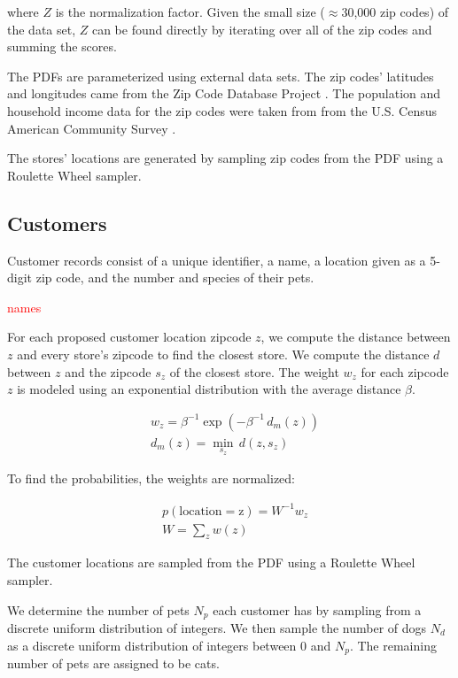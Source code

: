 \documentclass[conference]{IEEEtran}
\begin{document}
where $Z$ is the normalization factor.  Given the small size ($\approx$30,000 zip codes) of the data set, $Z$ can be found directly by iterating over all of the zip codes and summing the scores.

The PDFs are parameterized using external data sets.  The zip codes' latitudes and longitudes came from the Zip Code Database Project \cite{Zips}.  The population and household income data for the zip codes were taken from from the U.S. Census American Community Survey \cite{ACS}. 

The stores' locations are generated by sampling zip codes from the PDF using a Roulette Wheel sampler.

\subsection{Customers}

Customer records consist of a unique identifier, a name, a location given as a 5-digit zip code, and the number and species of their pets.

\textcolor{red}{names}

For each proposed customer location zipcode $z$, we compute the distance between $z$ and every store's zipcode to find the closest store.  We compute the distance $d$ between $z$ and the zipcode $s_z$ of the closest store.  The weight $w_z$ for each zipcode $z$ is modeled using an exponential distribution with the average distance $\beta$.

\begin{align}
&w_z = \beta^{-1} \exp(-\beta^{-1} \, d_m(z)) \\
&d_m(z) = \min_{s_z} \, d(z, s_z) \nonumber
\end{align}

To find the probabilities, the weights are normalized:

\begin{align}
&p(\text{location} = \text{z}) = W^{-1} w_z \\
&W = \sum_{z} w(z) \nonumber
\end{align}

The customer locations are sampled from the PDF using a Roulette Wheel sampler.

We determine the number of pets $N_p$ each customer has by sampling from a discrete uniform distribution of integers. We then sample the number of dogs $N_d$ as a discrete uniform distribution of integers between 0 and $N_p$.  The remaining number of pets are assigned to be cats.
\end{document}
